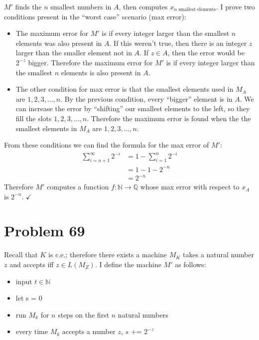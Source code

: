 \documentclass[11pt]{article}
\let\imp\rightarrow
\begin{document}
$M'$ finds the $n$ smallest numbers in $A$, then computes $x_{n \text{ smallest elements}}$.
I prove two conditions present in the ``worst case'' scenario (max error):
\begin{itemize}
	\item The maximum error for $M'$ is if every integer larger than the smallest $n$ elements was also present in $A$.
	If this weren't true, then there is an integer $z$ larger than the smaller element not in $A$.
	If $z \in A$, then the error would be $2^{-z}$ bigger.
	Therefore the maximum error for $M'$ is if every integer larger than the smallest $n$ elements is also present in $A$.
	\item The other condition for max error is that the smallest elements used in $M_A$ are $1,2,3, \ldots, n$.
	By the previous condition, every ``bigger'' element is in $A$.
	We can increase the error by ``shifting'' our smallest elements to the left, so they fill the slots $1, 2, 3, \ldots, n$.
	Therefore the maximum error is found when the the smallest elements in $M_A$ are $1,2,3, \ldots, n$.
\end{itemize}

From these conditions we can find the formula for the max error of $M'$:
\begin{align*}
	\sum \limits _{i=n+1} ^{\infty} 2^{-i}&= 1 - \sum \limits _{i=1} ^{n} 2^{-i} \\
	&= 1 - 1 - 2^{-n} \\
	&= 2^{-n}
\end{align*}
Therefore $M'$ computes a function $f: \mathbb{N} \imp \mathbb{Q}$ whose max error with respect to $x_A$ is $2^{-n}$. $\checkmark$


\section*{Problem 69}

Recall that $K$ is c.e.; therefore there exists a machine $M_K$ takes a natural number $z$ and accepts iff $z \in L(M_Z)$.
I define the machine $M'$ as follows:
\begin{itemize}
	\item input $t \in \mathbb{N}$
	\item let s = 0
	\item run $M_k$ for $n$ steps on the first $n$ natural numbers
	\item every time $M_k$ accepts a number $z$, $s$ += $2^{-z}$
\end{itemize}
\end{document}
